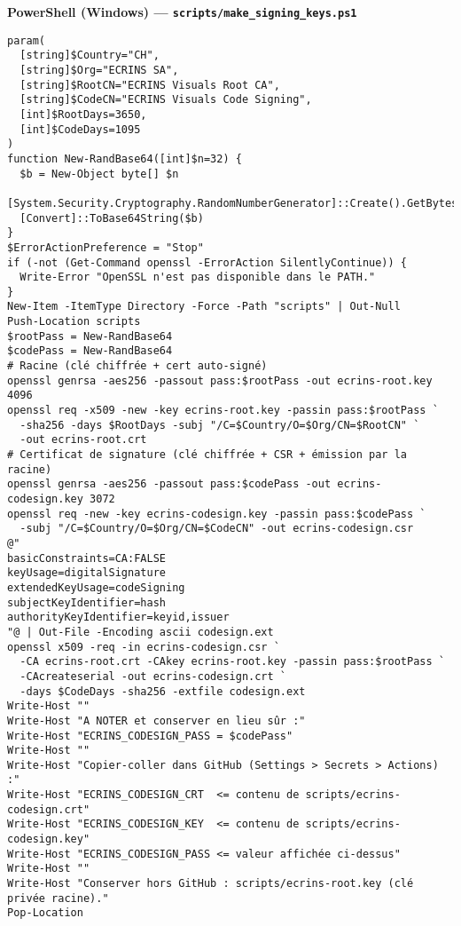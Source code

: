 \textbf{PowerShell (Windows) — \texttt{scripts/make\_signing\_keys.ps1}}
\begin{verbatim}
param(
  [string]$Country="CH",
  [string]$Org="ECRINS SA",
  [string]$RootCN="ECRINS Visuals Root CA",
  [string]$CodeCN="ECRINS Visuals Code Signing",
  [int]$RootDays=3650,
  [int]$CodeDays=1095
)
function New-RandBase64([int]$n=32) {
  $b = New-Object byte[] $n
  [System.Security.Cryptography.RandomNumberGenerator]::Create().GetBytes($b)
  [Convert]::ToBase64String($b)
}
$ErrorActionPreference = "Stop"
if (-not (Get-Command openssl -ErrorAction SilentlyContinue)) {
  Write-Error "OpenSSL n'est pas disponible dans le PATH."
}
New-Item -ItemType Directory -Force -Path "scripts" | Out-Null
Push-Location scripts
$rootPass = New-RandBase64
$codePass = New-RandBase64
# Racine (clé chiffrée + cert auto-signé)
openssl genrsa -aes256 -passout pass:$rootPass -out ecrins-root.key 4096
openssl req -x509 -new -key ecrins-root.key -passin pass:$rootPass `
  -sha256 -days $RootDays -subj "/C=$Country/O=$Org/CN=$RootCN" `
  -out ecrins-root.crt
# Certificat de signature (clé chiffrée + CSR + émission par la racine)
openssl genrsa -aes256 -passout pass:$codePass -out ecrins-codesign.key 3072
openssl req -new -key ecrins-codesign.key -passin pass:$codePass `
  -subj "/C=$Country/O=$Org/CN=$CodeCN" -out ecrins-codesign.csr
@"
basicConstraints=CA:FALSE
keyUsage=digitalSignature
extendedKeyUsage=codeSigning
subjectKeyIdentifier=hash
authorityKeyIdentifier=keyid,issuer
"@ | Out-File -Encoding ascii codesign.ext
openssl x509 -req -in ecrins-codesign.csr `
  -CA ecrins-root.crt -CAkey ecrins-root.key -passin pass:$rootPass `
  -CAcreateserial -out ecrins-codesign.crt `
  -days $CodeDays -sha256 -extfile codesign.ext
Write-Host ""
Write-Host "A NOTER et conserver en lieu sûr :"
Write-Host "ECRINS_CODESIGN_PASS = $codePass"
Write-Host ""
Write-Host "Copier-coller dans GitHub (Settings > Secrets > Actions) :"
Write-Host "ECRINS_CODESIGN_CRT  <= contenu de scripts/ecrins-codesign.crt"
Write-Host "ECRINS_CODESIGN_KEY  <= contenu de scripts/ecrins-codesign.key"
Write-Host "ECRINS_CODESIGN_PASS <= valeur affichée ci-dessus"
Write-Host ""
Write-Host "Conserver hors GitHub : scripts/ecrins-root.key (clé privée racine)."
Pop-Location
\end{verbatim}

